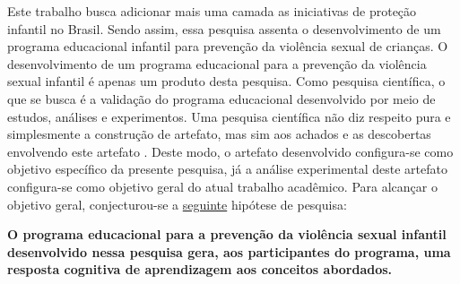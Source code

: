 Este trabalho busca adicionar mais uma camada as iniciativas de proteção infantil no Brasil. Sendo assim, essa pesquisa assenta o desenvolvimento de um programa educacional infantil para prevenção da violência sexual de crianças. O desenvolvimento de um programa educacional para a prevenção da violência sexual infantil é apenas um produto desta pesquisa. Como pesquisa científica, o que se busca é a validação do programa educacional desenvolvido por meio de estudos, análises e experimentos. Uma pesquisa científica não diz respeito pura e simplesmente a construção de artefato, mas sim aos achados e as descobertas envolvendo este artefato \cite{wazlawick2014metodologia}. Deste modo, o artefato desenvolvido configura-se como objetivo específico da presente pesquisa, já a análise experimental deste artefato configura-se como objetivo geral do atual trabalho acadêmico. Para alcançar o objetivo geral, conjecturou-se a \hyperref[hipotese]{seguinte} hipótese de pesquisa: 


\vspace{0.6cm}

\vspace{-0.6cm}
\begin{framed}
  \textbf{O programa educacional para a prevenção da violência sexual infantil desenvolvido nessa pesquisa gera, aos participantes do programa, uma resposta cognitiva de aprendizagem aos conceitos abordados.} 
\end{framed}

